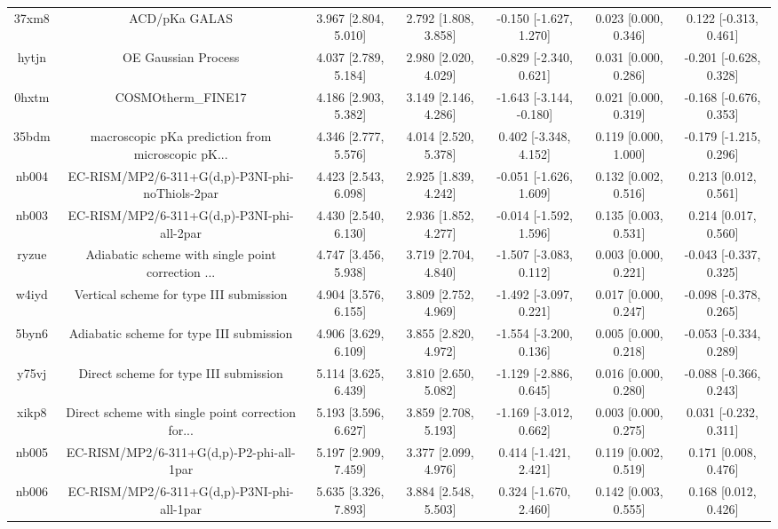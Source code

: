 \documentclass{article}
\begin{document}
\begin{center}
\begin{longtable}{|ccccccc|}
 37xm8 &                                      ACD/pKa GALAS &  3.967 [2.804, 5.010] &  2.792 [1.808, 3.858] &   -0.150 [-1.627, 1.270] &  0.023 [0.000, 0.346] &   0.122 [-0.313, 0.461] \\
 hytjn &                                OE Gaussian Process &  4.037 [2.789, 5.184] &  2.980 [2.020, 4.029] &   -0.829 [-2.340, 0.621] &  0.031 [0.000, 0.286] &  -0.201 [-0.628, 0.328] \\
 0hxtm &                                 COSMOtherm\_FINE17 &  4.186 [2.903, 5.382] &  3.149 [2.146, 4.286] &  -1.643 [-3.144, -0.180] &  0.021 [0.000, 0.319] &  -0.168 [-0.676, 0.353] \\
 35bdm &  macroscopic pKa prediction from microscopic pK... &  4.346 [2.777, 5.576] &  4.014 [2.520, 5.378] &    0.402 [-3.348, 4.152] &  0.119 [0.000, 1.000] &  -0.179 [-1.215, 0.296] \\
 nb004 &    EC-RISM/MP2/6-311+G(d,p)-P3NI-phi-noThiols-2par &  4.423 [2.543, 6.098] &  2.925 [1.839, 4.242] &   -0.051 [-1.626, 1.609] &  0.132 [0.002, 0.516] &    0.213 [0.012, 0.561] \\
 nb003 &         EC-RISM/MP2/6-311+G(d,p)-P3NI-phi-all-2par &  4.430 [2.540, 6.130] &  2.936 [1.852, 4.277] &   -0.014 [-1.592, 1.596] &  0.135 [0.003, 0.531] &    0.214 [0.017, 0.560] \\
 ryzue &  Adiabatic scheme with single point correction ... &  4.747 [3.456, 5.938] &  3.719 [2.704, 4.840] &   -1.507 [-3.083, 0.112] &  0.003 [0.000, 0.221] &  -0.043 [-0.337, 0.325] \\
 w4iyd &            Vertical scheme for type III submission &  4.904 [3.576, 6.155] &  3.809 [2.752, 4.969] &   -1.492 [-3.097, 0.221] &  0.017 [0.000, 0.247] &  -0.098 [-0.378, 0.265] \\
 5byn6 &           Adiabatic scheme for type III submission &  4.906 [3.629, 6.109] &  3.855 [2.820, 4.972] &   -1.554 [-3.200, 0.136] &  0.005 [0.000, 0.218] &  -0.053 [-0.334, 0.289] \\
 y75vj &              Direct scheme for type III submission &  5.114 [3.625, 6.439] &  3.810 [2.650, 5.082] &   -1.129 [-2.886, 0.645] &  0.016 [0.000, 0.280] &  -0.088 [-0.366, 0.243] \\
 xikp8 &  Direct scheme with single point correction for... &  5.193 [3.596, 6.627] &  3.859 [2.708, 5.193] &   -1.169 [-3.012, 0.662] &  0.003 [0.000, 0.275] &   0.031 [-0.232, 0.311] \\
 nb005 &           EC-RISM/MP2/6-311+G(d,p)-P2-phi-all-1par &  5.197 [2.909, 7.459] &  3.377 [2.099, 4.976] &    0.414 [-1.421, 2.421] &  0.119 [0.002, 0.519] &    0.171 [0.008, 0.476] \\
 nb006 &         EC-RISM/MP2/6-311+G(d,p)-P3NI-phi-all-1par &  5.635 [3.326, 7.893] &  3.884 [2.548, 5.503] &    0.324 [-1.670, 2.460] &  0.142 [0.003, 0.555] &    0.168 [0.012, 0.426] \\
\end{longtable}
\end{center}
\end{document}
